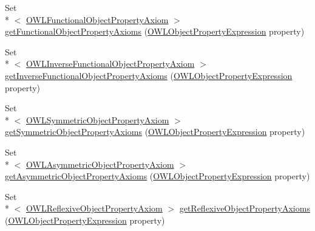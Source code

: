 \begin{DoxyCompactItemize}
\item 
Set\\*
$<$ \hyperlink{interfaceorg_1_1semanticweb_1_1owlapi_1_1model_1_1_o_w_l_functional_object_property_axiom}{O\-W\-L\-Functional\-Object\-Property\-Axiom} $>$ \hyperlink{classuk_1_1ac_1_1manchester_1_1cs_1_1owl_1_1owlapi_1_1_o_w_l_ontology_impl_aa0cc3606c2b15acf5d83451c14636065}{get\-Functional\-Object\-Property\-Axioms} (\hyperlink{interfaceorg_1_1semanticweb_1_1owlapi_1_1model_1_1_o_w_l_object_property_expression}{O\-W\-L\-Object\-Property\-Expression} property)
\item 
Set\\*
$<$ \hyperlink{interfaceorg_1_1semanticweb_1_1owlapi_1_1model_1_1_o_w_l_inverse_functional_object_property_axiom}{O\-W\-L\-Inverse\-Functional\-Object\-Property\-Axiom} $>$ \hyperlink{classuk_1_1ac_1_1manchester_1_1cs_1_1owl_1_1owlapi_1_1_o_w_l_ontology_impl_acbcb5b65210494506eae82c4c40bcec8}{get\-Inverse\-Functional\-Object\-Property\-Axioms} (\hyperlink{interfaceorg_1_1semanticweb_1_1owlapi_1_1model_1_1_o_w_l_object_property_expression}{O\-W\-L\-Object\-Property\-Expression} property)
\item 
Set\\*
$<$ \hyperlink{interfaceorg_1_1semanticweb_1_1owlapi_1_1model_1_1_o_w_l_symmetric_object_property_axiom}{O\-W\-L\-Symmetric\-Object\-Property\-Axiom} $>$ \hyperlink{classuk_1_1ac_1_1manchester_1_1cs_1_1owl_1_1owlapi_1_1_o_w_l_ontology_impl_ae20d566ebfe185b5dbe6d2792252160b}{get\-Symmetric\-Object\-Property\-Axioms} (\hyperlink{interfaceorg_1_1semanticweb_1_1owlapi_1_1model_1_1_o_w_l_object_property_expression}{O\-W\-L\-Object\-Property\-Expression} property)
\item 
Set\\*
$<$ \hyperlink{interfaceorg_1_1semanticweb_1_1owlapi_1_1model_1_1_o_w_l_asymmetric_object_property_axiom}{O\-W\-L\-Asymmetric\-Object\-Property\-Axiom} $>$ \hyperlink{classuk_1_1ac_1_1manchester_1_1cs_1_1owl_1_1owlapi_1_1_o_w_l_ontology_impl_aad339d7bc27736d90e1b92b1b1b465ca}{get\-Asymmetric\-Object\-Property\-Axioms} (\hyperlink{interfaceorg_1_1semanticweb_1_1owlapi_1_1model_1_1_o_w_l_object_property_expression}{O\-W\-L\-Object\-Property\-Expression} property)
\item 
Set\\*
$<$ \hyperlink{interfaceorg_1_1semanticweb_1_1owlapi_1_1model_1_1_o_w_l_reflexive_object_property_axiom}{O\-W\-L\-Reflexive\-Object\-Property\-Axiom} $>$ \hyperlink{classuk_1_1ac_1_1manchester_1_1cs_1_1owl_1_1owlapi_1_1_o_w_l_ontology_impl_a37bfcac8ef73be174ed1111d4831c001}{get\-Reflexive\-Object\-Property\-Axioms} (\hyperlink{interfaceorg_1_1semanticweb_1_1owlapi_1_1model_1_1_o_w_l_object_property_expression}{O\-W\-L\-Object\-Property\-Expression} property)

\end{DoxyCompactItemize}
